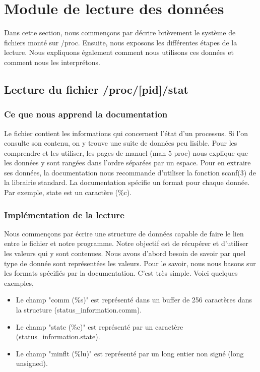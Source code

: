 \section{Module de lecture des données}
Dans cette section, nous commençons par décrire brièvement le système de fichiers monté sur /proc. Ensuite, nous exposons les différentes étapes de la lecture. Nous expliquons également comment nous utilisons ces données et comment nous les interprétons.

\subsection{Lecture du fichier /proc/[pid]/stat}
\subsubsection{Ce que nous apprend la documentation}
Le fichier contient les informations qui concernent l’état d'un processus. Si l'on consulte son contenu, on y trouve une suite de données peu lisible.
Pour les comprendre et les utiliser, les pages de manuel (man 5 proc) nous explique que les données y sont rangées dans l'ordre séparées par un espace. Pour en extraire ses données, la documentation nous recommande d'utiliser la fonction scanf(3) de la librairie standard. La documentation spécifie un format pour chaque donnée. Par exemple, state est un caractère (\%c).

\subsubsection{Implémentation de la lecture}
Nous commençons par écrire une structure de données capable de faire le lien entre le fichier et notre programme. Notre objectif est de récupérer et d’utiliser les valeurs qui y sont contenues.
Nous avons d’abord besoin de savoir par quel type de donnée sont représentées les valeurs. Pour le savoir, nous nous basons sur les formats spécifiés par la documentation. C’est très simple. Voici quelques exemples,

\begin{itemize}
\item Le champ "comm (\%s)" est représenté dans un buffer de 256 caractères dans la structure (status\_information.comm).
\item Le champ "state (\%c)" est représenté par un caractère (status\_information.state).
\item Le champ "minflt (\%lu)" est représenté par un long entier non signé (long unsigned).
\end{itemize}

